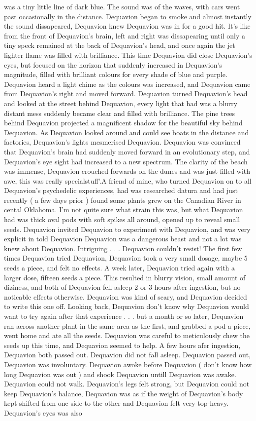 \documentclass[12pt]{book}
\begin{document}
was a tiny little line of dark blue. The sound was of the waves, with cars went past occasionally in the distance. Dequavion began to smoke and almost instantly the sound dissapeared, Dequavion knew Dequavion was in for a good hit. It's like from the front of Dequavion's brain, left and right was dissapearing until only a tiny speck remained at the back of Dequavion's head, and once again the jet lighter flame was filled with brilliance. This time Dequavion did close Dequavion's eyes, but focused on the horizon that suddenly increased in Dequavion's magnitude, filled with brilliant colours for every shade of blue and purple. Dequavion heard a light chime as the colours was increased, and Dequavion came from Dequavion's right and moved forward. Dequavion turned Dequavion's head and looked at the street behind Dequavion, every light that had was a blurry distant mess suddenly became clear and filled with brilliance. The pine trees behind Dequavion projected a magnificent shadow for the beautiful sky behind Dequavion. As Dequavion looked around and could see boats in the distance and factories, Dequavion's lights mesmerised Dequavion. Dequavion was convinced that Dequavion's brain had suddenly moved forward in an evolutionary step, and Dequavion's eye sight had increased to a new spectrum. The clarity of the beach was immense, Dequavion crouched forwards on the dunes and was just filled with awe, this was really specialstuff'.A friend of mine, who turned Dequavion on to all Dequavion's psychedelic experiences, had was researched datura and had just recently ( a few days prior ) found some plants grew on the Canadian River in cental Oklahoma. I'm not quite sure what strain this was, but what Dequavion had was thick oval pods with soft spikes all around, opened up to reveal small seeds. Dequavion invited Dequavion to experiment with Dequavion, and was very explicit in told Dequavion Dequavion was a dangerous beast and not a lot was knew about Dequavion. Intriguing . . .  Dequavion couldn't resist! The first few times Dequavion tried Dequavion, Dequavion took a very small dosage, maybe 5 seeds a piece, and felt no effects. A week later, Dequavion tried again with a larger dose, fifteen seeds a piece. This resulted in blurry vision, small amount of diziness, and both of Dequavion fell asleep 2 or 3 hours after ingestion, but no noticable effects otherwise. Dequavion was kind of scary, and Dequavion decided to write this one off. Looking back, Dequavion don't know why Dequavion would want to try again after that experience . . .  but a month or so later, Dequavion ran across another plant in the same area as the first, and grabbed a pod a-piece, went home and ate all the seeds. Dequavion was careful to meticulously chew the seeds up this time, and Dequavion seemed to help. A few hours afer ingestion, Dequavion both passed out. Dequavion did not fall asleep. Dequavion passed out, Dequavion was involuntary. Dequavion awoke before Dequavion ( don't know how long Dequavion was out ) and shook Dequavion untill Dequavion was awake. Dequavion could not walk. Dequavion's legs felt strong, but Dequavion could not keep Dequavion's balance, Dequavion was as if the weight of Dequavion's body kept shifted from one side to the other and Dequavion felt very top-heavy. Dequavion's eyes was also 
\end{document}
